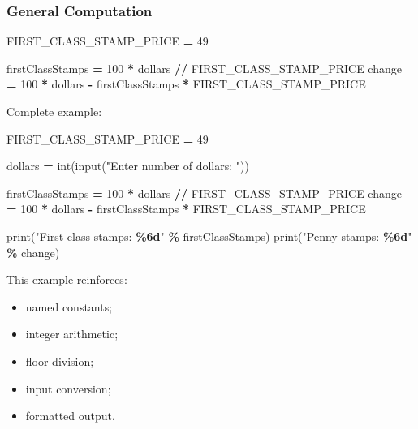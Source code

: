 \documentclass[
]{article}
\newenvironment{Shaded}{\begin{snugshade}}{\end{snugshade}}
\newcommand{\BuiltInTok}[1]{#1}
\newcommand{\DecValTok}[1]{\textcolor[rgb]{0.00,0.00,0.81}{#1}}
\newcommand{\NormalTok}[1]{#1}
\newcommand{\OperatorTok}[1]{\textcolor[rgb]{0.81,0.36,0.00}{\textbf{#1}}}
\newcommand{\SpecialCharTok}[1]{\textcolor[rgb]{0.81,0.36,0.00}{\textbf{#1}}}
\newcommand{\StringTok}[1]{\textcolor[rgb]{0.31,0.60,0.02}{#1}}
\providecommand{\tightlist}{%
  \setlength{\itemsep}{0pt}\setlength{\parskip}{0pt}}
\begin{document}
\subsubsection{General Computation}\label{general-computation}

\begin{Shaded}
\begin{Highlighting}[]
\NormalTok{FIRST\_CLASS\_STAMP\_PRICE }\OperatorTok{=} \DecValTok{49}

\NormalTok{firstClassStamps }\OperatorTok{=} \DecValTok{100} \OperatorTok{*}\NormalTok{ dollars }\OperatorTok{//}\NormalTok{ FIRST\_CLASS\_STAMP\_PRICE}
\NormalTok{change }\OperatorTok{=} \DecValTok{100} \OperatorTok{*}\NormalTok{ dollars }\OperatorTok{{-}}\NormalTok{ firstClassStamps }\OperatorTok{*}\NormalTok{ FIRST\_CLASS\_STAMP\_PRICE}
\end{Highlighting}
\end{Shaded}

Complete example:

\begin{Shaded}
\begin{Highlighting}[]
\NormalTok{FIRST\_CLASS\_STAMP\_PRICE }\OperatorTok{=} \DecValTok{49}

\NormalTok{dollars }\OperatorTok{=} \BuiltInTok{int}\NormalTok{(}\BuiltInTok{input}\NormalTok{(}\StringTok{"Enter number of dollars: "}\NormalTok{))}

\NormalTok{firstClassStamps }\OperatorTok{=} \DecValTok{100} \OperatorTok{*}\NormalTok{ dollars }\OperatorTok{//}\NormalTok{ FIRST\_CLASS\_STAMP\_PRICE}
\NormalTok{change }\OperatorTok{=} \DecValTok{100} \OperatorTok{*}\NormalTok{ dollars }\OperatorTok{{-}}\NormalTok{ firstClassStamps }\OperatorTok{*}\NormalTok{ FIRST\_CLASS\_STAMP\_PRICE}

\BuiltInTok{print}\NormalTok{(}\StringTok{"First class stamps: }\SpecialCharTok{\%6d}\StringTok{"} \OperatorTok{\%}\NormalTok{ firstClassStamps)}
\BuiltInTok{print}\NormalTok{(}\StringTok{"Penny stamps:       }\SpecialCharTok{\%6d}\StringTok{"} \OperatorTok{\%}\NormalTok{ change)}
\end{Highlighting}
\end{Shaded}

This example reinforces:

\begin{itemize}
\tightlist
\item
  named constants;
\item
  integer arithmetic;
\item
  floor division;
\item
  input conversion;
\item
  formatted output.
\end{itemize}
\end{document}
